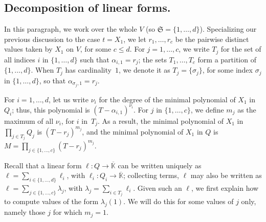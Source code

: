 \documentclass[12pt]{article}
\def\Kbar {{\ensuremath{\overline{\mathbb{K}}}}}
\begin{document}
\subsection{Decomposition of linear forms.}

In this paragraph, we work over the whole $V$ (so
$\mathfrak{S}=\{1,\dots,d\}$).  Specializing our previous discussion
to the case $t=X_1$, we let $r_1,\dots,r_c$ be the pairwise distinct
values taken by $X_1$ on $V$, for some $c \le d$.  For
$j=1,\dots,c$, we write $T_j$ for the set of all indices $i$ in
$\{1,\dots,d\}$ such that $\alpha_{i,1}=r_j$; the sets $T_1,\dots,T_c$
form a partition of $\{1,\dots,d\}$. When $T_j$ has cardinality~$1$,
we denote it as $T_j=\{\sigma_j\}$, for some index $\sigma_j$ in
$\{1,\dots,d\}$, so that $\alpha_{\sigma_j,1}=r_j$.

For $i=1,\dots,d$, let us write $\nu_i$ for the degree of the minimal
polynomial of $X_1$ in $Q_i$; thus, this polynomial is
$(T-\alpha_{i,1})^{\nu_i}$. For $j$ in $\{1,\dots,c\}$, we define
$m_j$ as the maximum of all $\nu_i$, for $i$ in~$T_j$. As a result, the minimal
polynomial of $X_1$ in $\prod_{j \in T_j} Q_j$ is 
$(T-r_j)^{m_j}$, and the minimal polynomial of $X_1$ in $Q$ is
$M=\prod_{j \in \{1,\dots,c\}} (T-r_j)^{m_j}$.

Recall that a linear form $\ell: Q \to \Kbar$ can be written uniquely
as $\ell=\sum_{i\in \{1,\dots,d\}} \ell_i$, with $\ell_i:Q_i \to
\Kbar$; collecting terms, $\ell$ may also be written as $\ell=\sum_{j
	\in \{1,\dots,c\}} \lambda_j$, with $\lambda_j=\sum_{i \in T_j}
\ell_i$.  Given such an $\ell$, we first explain how to compute values
of the form $\lambda_j(1)$. We will do this for some values of $j$
only, namely those $j$ for which $m_j=1$.
\end{document}
